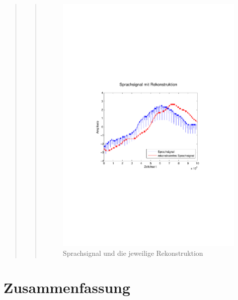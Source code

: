 \begin{quote}
\begin{quote}
            \begin{figure}[H]
            \centering
            \includegraphics[scale=0.6, trim = 3.5cm 9cm 4cm 9cm,
            clip]{./Bilder/sprache+rekon}
                \caption{Sprachsignal und die jeweilige Rekonstruktion}
            \end{figure}
            
        \end{quote}  %
       	
       	
         	
    \end{quote}%
    
    \section{Zusammenfassung}
    \begin{quote}
    \end{quote}%
         

